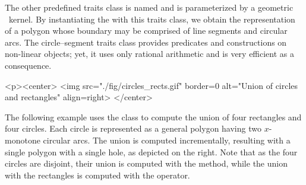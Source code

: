 The other predefined traits class is named 
 and is parameterized by a
geometric \cgal\ kernel. By instantiating the 
with this traits class, we obtain the representation of a polygon whose
boundary may be comprised of line segments and circular arcs.
The circle--segment traits class provides predicates and constructions
on non-linear objects; yet, it uses only rational arithmetic and is
very efficient as a consequence.

\lcTex{%
  \setlength{\BooleanSetOpsWidthRight}{2.4cm}
  \setlength{\BooleanSetOpsWidthLeft}{\BooleanSetOpsWidthLineReal}
  \addtolength{\BooleanSetOpsWidthLeft}{-\BooleanSetOpsWidthRight}
  \begin{minipage}{\BooleanSetOpsWidthLeft}
}
\label{fig:circle_recs}
\begin{ccHtmlOnly}
  <p><center>
    <img src="./fig/circles_rects.gif" border=0 alt="Union of circles
    and rectangles" align=right>
  </center>
\end{ccHtmlOnly}
The following example uses the  class
to compute the union of four rectangles and four circles. Each circle
is represented as a general polygon having two $x$-monotone circular arcs.
The union is computed incrementally, resulting with a single polygon with
a single hole, as depicted on the right. Note that as the four circles
are disjoint, their union is computed with the  method,
while the union with the rectangles is computed with the 
operator.

